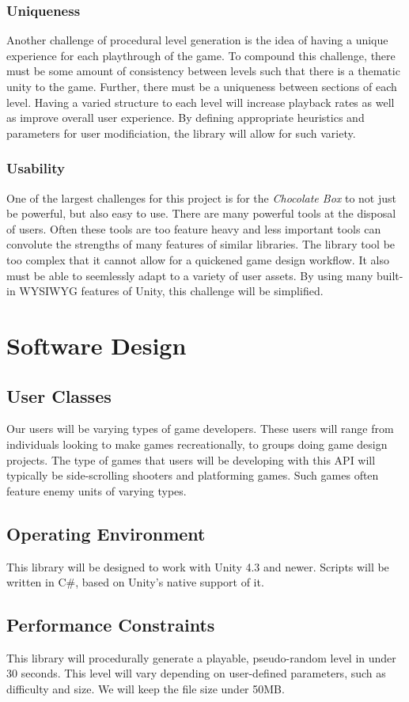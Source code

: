 \documentclass[pdftex,12pt,letter]{article}
\begin{document}
\begin{itemize}
\begin{itemize}
\begin{itemize}
\subsubsection{Uniqueness}
Another challenge of procedural level generation is the idea of having a unique experience for each playthrough of the game. To compound this challenge, there must be some amount of consistency between levels such that there is a thematic unity to the game. Further, there must be a uniqueness between sections of each level. Having a varied structure to each level will increase playback rates as well as improve overall user experience. By defining appropriate heuristics and parameters for user modificiation, the library will allow for such variety. 
\subsubsection{Usability}
One of the largest challenges for this project is for the \textit{Chocolate Box} to not just be powerful, but also easy to use. There are many powerful tools at the disposal of users. Often these tools are too feature heavy and less important tools can convolute the strengths of many features of similar libraries. The library tool be too complex that it cannot allow for a quickened game design workflow. It also must be able to seemlessly adapt to a variety of user assets. By using many built-in WYSIWYG features of Unity, this challenge will be simplified. 


\section{Software Design}
\subsection{User Classes}
Our users will be varying types of game developers. These users will range from individuals looking to make games recreationally, to groups doing game design projects. The type of games that users will be developing with this API will typically be side-scrolling shooters and platforming games. Such games often feature enemy units of varying types.
\subsection{Operating Environment}
This library will be designed to work with Unity 4.3 and newer. Scripts will be written in C\#, based on Unity's native support of it.
\subsection{Performance Constraints}
This library will procedurally generate a playable, pseudo-random level in under 30 seconds. This level will vary depending on user-defined parameters, such as difficulty and size. We will keep the file size under 50MB.

\end{itemize}
\end{itemize}
\end{itemize}
\end{document}
